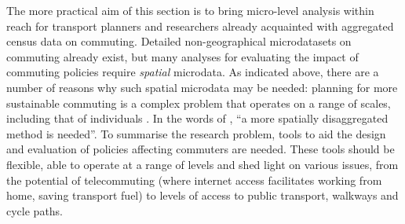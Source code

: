 The more practical aim of this section is to bring micro-level analysis
within reach for transport planners and
researchers already acquainted with aggregated census data on commuting.
Detailed non-geographical microdatasets on commuting already exist,
but many analyses for evaluating the
impact of commuting policies require \emph{spatial} microdata. As indicated
above, there are a number of  reasons why such spatial microdata may be
needed: planning for more sustainable commuting is a complex problem that
operates on a range of scales, including that of individuals
\citep{Vega2012, Verhetsel2010}. In the words of \citet[p.~313]{Li2012}, ``a more spatially
disaggregated method is needed''. To summarise the research problem,
tools to aid the design and evaluation of policies affecting commuters are needed.
These tools should be flexible, able to operate at a range of
levels and shed light on various issues, from the potential of telecommuting
(where internet access facilitates working from home, saving transport fuel)
to levels of access to public transport, walkways and cycle paths.

